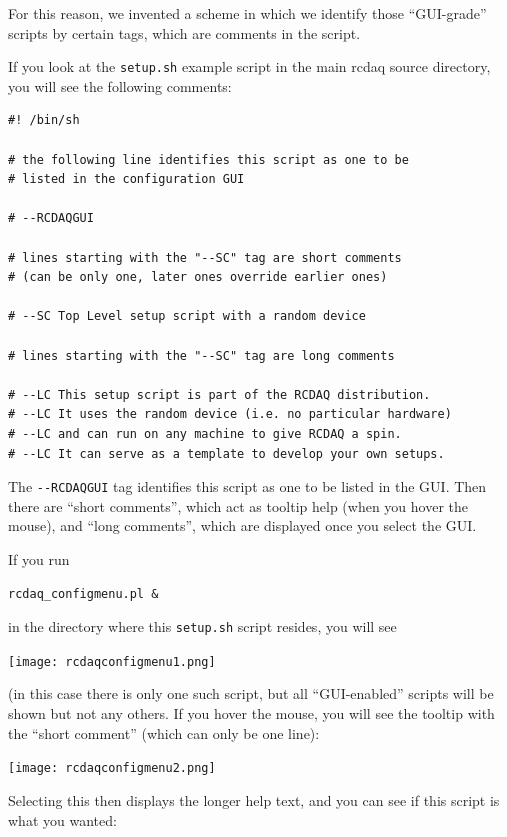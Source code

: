 \documentclass{article}[11pt]
\begin{document}
For this reason, we invented a scheme in which we identify those
``GUI-grade'' scripts by certain tags, which are comments in the
script.

If you look at the \verb|setup.sh| example script in the main rcdaq
source directory, you will see the following comments:

\begin{verbatim}
#! /bin/sh

# the following line identifies this script as one to be
# listed in the configuration GUI

# --RCDAQGUI

# lines starting with the "--SC" tag are short comments
# (can be only one, later ones override earlier ones)

# --SC Top Level setup script with a random device

# lines starting with the "--SC" tag are long comments

# --LC This setup script is part of the RCDAQ distribution.
# --LC It uses the random device (i.e. no particular hardware)
# --LC and can run on any machine to give RCDAQ a spin.
# --LC It can serve as a template to develop your own setups. 
\end{verbatim}

The \verb|--RCDAQGUI| tag identifies this script as one to be listed
in the GUI. Then there are ``short comments'', which act as tooltip
help (when you hover the mouse), and ``long comments'', which are
displayed once you select the GUI.

If you run 

\begin{verbatim}
rcdaq_configmenu.pl &
\end{verbatim}

in the directory where this \verb|setup.sh| script resides, you will see

\begin{center}
\texttt{[image: rcdaqconfigmenu1.png]}
\end{center}

(in this case there is only one such script, but all ``GUI-enabled'' scripts will be
shown but not any others. If you hover the mouse, you will see the tooltip with the 
``short comment'' (which can only be one line):

\begin{center}
\texttt{[image: rcdaqconfigmenu2.png]}
\end{center}

Selecting this then displays the longer help text, and you can see if
this script is what you wanted:
\end{document}
